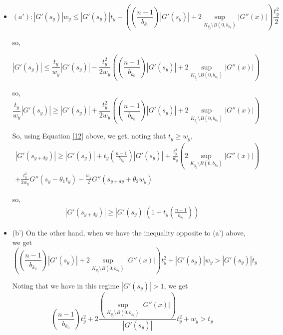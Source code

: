 \documentclass{article}
\theoremstyle{plain}
\theoremstyle{definition}
\theoremstyle{plain}
\begin{document}
\begin{itemize}
\item \begin{equation*}(a'): |G'(s_y)| w_y \le |G'(s_y)| t_y - \left( \left( \frac{n-1}{b_{k_0}} \right) |G'(s_y)| + 2 \sup_{K_{y_j} \setminus B(0, b_{k_0})} |G''(x)| \right) \frac{t_y^2}{2}\end{equation*}

so,

\begin{equation*}|G'(s_y)| \le \frac{t_y}{w_y} |G'(s_y)| - \frac{t_y^2}{2w_y} \left( \left( \frac{n-1}{b_{k_0}} \right) |G'(s_y)| + 2 \sup_{K_{y_j} \setminus B(0, b_{k_0})} |G''(x)| \right)
\end{equation*}

so, \begin{equation*}\frac{t_y}{w_y} |G'(s_y)| \ge |G'(s_y)| + \frac{t_y^2}{2w_y} \left( \left( \frac{n-1}{b_{k_0}} \right) |G'(s_y)| + 2 \sup_{K_{y_j} \setminus B(0, b_{k_0})} |G''(x)| \right)
\end{equation*}

So, using Equation \ref{12} above, we get, noting that $t_y \ge w_y$,
\begin{multline}
|G'(s_{y+dy})| \ge |G'(s_y)| + t_y \left( \frac{n-1}{b_{k_0}} \right) |G'(s_y)| + \frac{t_y^2}{w_y} \left( 2 \sup_{K_{y_j} \setminus B(0, b_{k_0})} |G''(x)| \right)\\ + \frac{t_y^2}{2w_y} G''(s_y - \theta_1 t_y) - \frac{w_y}{2} G''(s_{y+dy} + \theta_2 w_y)
\end{multline}

so, 
\begin{align}\label{eqa'}
|G'(s_{y+dy})| \ge |G'(s_y)| \left( 1 + t_y \left( \frac{n-1}{b_{k_0}} \right) \right)
\end{align}

\item (b') On the other hand, when we have the inequality opposite to (a') above, we get
\begin{equation}
\left( \left( \frac{n-1}{b_{k_0}} \right) |G'(s_y)| + 2 \sup_{K_{y_j} \setminus B(0, b_{k_0})} |G''(x)| \right) t_y^2 + |G'(s_y)| w_y > |G'(s_y)| t_y
\end{equation}

Noting that we have in this regime $|G'(s_y)| > 1$, we get
\begin{equation}
\left( \frac{n-1}{b_{k_0}} \right) t_y^2 + 2 \frac{\left( \sup_{K_{y_j} \setminus B(0, b_{k_0})} |G''(x)| \right)}{|G'(s_y)|} t_y^2 + w_y > t_y
\end{equation}


\end{itemize}
\end{document}
